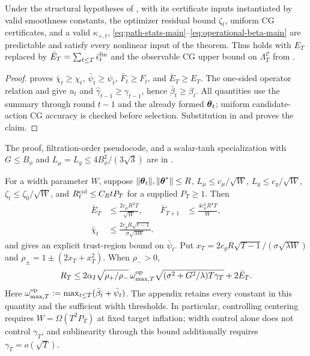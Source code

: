 \documentclass[twoside]{article}
\newcommand{\Calg}{\mathcal{C}}                 %
\newcommand{\Lamalg}{\Lambda^{\Calg}}           %
\begin{document}
\begin{corollary}\label{cor:operational}
Under the structural hypotheses of , with its certificate
inputs instantiated by valid smoothness constants, the
optimizer residual bound $\zeta_t$, uniform CG certificates, and a valid
$\kappa_{+,t}$, \eqref{eq:path-stats-main}--\eqref{eq:operational-beta-main}
are predictable and satisfy every nonlinear input of the theorem.  Thus
 holds with $E_T$ replaced by
$\bar E_T=\sum_{t\le T}\bar\epsilon_t^{\rm lin}$ and the observable CG upper
bound on $\Lamalg_T$ from .
\end{corollary}
\begin{proof}
 proves
$\bar\chi_t\ge\chi_t$, $\bar\psi_t\ge\psi_t$,
$\bar F_t\ge F_t$, and $\bar E_T\ge E_T$.  The one-sided operator relation
and  give $u_t$ and
$\hat\gamma_{t-1}\ge\gamma_{t-1}$, hence
$\bar\beta_t\ge\beta_t$.  All quantities use the summary through round $t-1$
and the already formed $\boldsymbol{\theta}_t$; uniform candidate-action CG accuracy is
checked before selection.  Substitution in  and
 proves the claim.
\end{proof}
The proof, filtration-order pseudocode, and a scalar-tanh specialization with
$G\le B_\phi$ and $L_\mu=L_g\le4B_\phi^2/(3\sqrt3)$ are in
.

For a width parameter $W$, suppose $\|\boldsymbol{\theta}_t\|,\|\boldsymbol{\theta}^*\|\le R$,
$L_\mu\le c_\mu/\sqrt W$, $L_g\le c_g/\sqrt W$,
$\zeta_t\le\zeta_0/\sqrt W$, and
$R_t^{\rm col}\le C_RtP_T$ for a supplied $P_T\ge1$.  Then
\begin{equation}\label{eq:near-linear-rates-main}
\begin{aligned}
 \bar E_T&\le\frac{2c_\mu R^2T}{\sqrt W},&
 \bar F_{T+1}&\le\frac{4c_\mu^2R^4T}{W},\\
 \bar\chi_t&\le\frac{2c_gR\sqrt{t-1}}{\sigma\sqrt{\lambda W}}.&&
\end{aligned}
\end{equation}
and  gives an explicit trust-region bound on
$\bar\psi_t$.  Put
$x_T=2c_gR\sqrt{T-1}/(\sigma\sqrt{\lambda W})$ and
$\rho_\pm=1\pm(2x_T+x_T^2)$.  When $\rho_->0$,
\begin{equation}\label{eq:near-linear-regret-main}
R_T\le2\alpha_I\sqrt{\rho_+/\rho_-}\,\omega_{\max,T}^{\rm op}
 \sqrt{(\sigma^2+G^2/\lambda)T\gamma_T}+2\bar E_T.
\end{equation}
Here $\omega_{\max,T}^{\rm op}:=\max_{t\le T}(\bar\beta_t+\bar\psi_t)$.
The appendix retains every constant in this quantity and the
sufficient width thresholds.  In particular, controlling centering requires
$W=\Omega(T^2P_T)$ at fixed target inflation; width control alone does not
control $\gamma_T$, and sublinearity through this bound additionally requires
$\gamma_T=o(\sqrt T)$.
\end{document}
